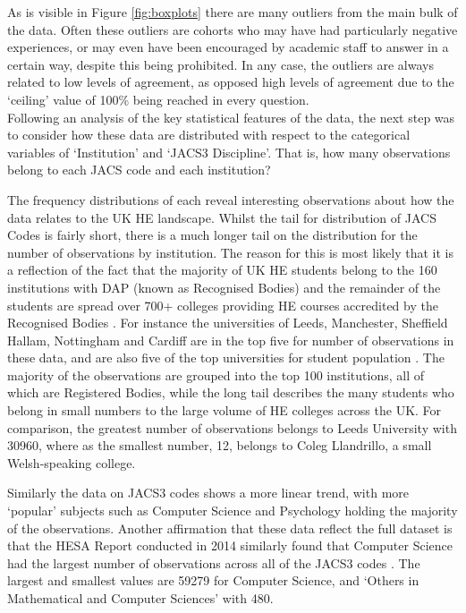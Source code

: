 \documentclass[11pt,a4paper]{report}
\begin{document}
As is visible in Figure \ref{fig:boxplots} there are many outliers from the main bulk of the data. Often these outliers are cohorts who may have had particularly negative experiences, or may even have been encouraged by academic staff to answer in a certain way, despite this being prohibited. In any case, the outliers are always related to low levels of agreement, as opposed high levels of agreement due to the `ceiling' value of 100\% being reached in every question. \\


Following an analysis of the key statistical features of the data, the next step was to consider how these data are distributed with respect to the categorical variables of `Institution' and `JACS3 Discipline'. That is, how many observations belong to each JACS code and each institution? 

The frequency distributions of each reveal interesting observations about how the data relates to the UK HE landscape. Whilst the tail for distribution of JACS Codes is fairly short, there is a much longer tail on the distribution for the number of observations by institution. The reason for this is most likely that it is a reflection of the fact that the majority of UK HE students belong to the 160 institutions with \ac{DAP} (known as Recognised Bodies) and the remainder of the students are spread over 700+ colleges providing \ac{HE} courses accredited by the Recognised Bodies \cite{UniCollegeLists}. For instance the universities of Leeds, Manchester, Sheffield Hallam, Nottingham and Cardiff are in the top five for number of observations in these data, and are also five of the top universities for student population \cite{HESAProviderData}. The majority of the observations are grouped into the top 100 institutions, all of which are Registered Bodies, while the long tail describes the many students who belong in small numbers to the large volume of HE colleges across the UK. For comparison, the greatest number of observations belongs to Leeds University with 30960, where as the smallest number, 12, belongs to Coleg Llandrillo, a small Welsh-speaking college. 

Similarly the data on JACS3 codes shows a more linear trend, with more `popular' subjects such as Computer Science and Psychology holding the majority of the observations. Another affirmation that these data reflect the full dataset is that the HESA Report conducted in 2014 similarly found that Computer Science had the largest number of observations across all of the JACS3 codes \cite{HEFCEreport2014}. The largest and smallest values are 59279 for Computer Science, and `Others in Mathematical and Computer Sciences' with 480. 
\end{document}
